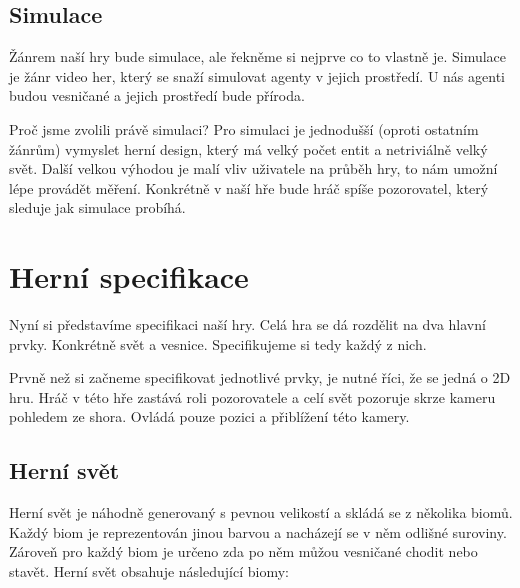 
\subsection{Simulace}
Žánrem naší hry bude simulace, ale řekněme si nejprve co to vlastně je. Simulace je žánr video her, který se snaží simulovat agenty v jejich prostředí. U nás agenti budou vesničané a jejich prostředí bude příroda.

Proč jsme zvolili právě simulaci? Pro simulaci je jednodušší (oproti ostatním žánrům) vymyslet herní design, který má velký počet entit a netriviálně velký svět. Další velkou výhodou je malí vliv uživatele na průběh hry, to nám umožní lépe provádět měření. Konkrétně v naší hře bude hráč spíše pozorovatel, který sleduje jak simulace probíhá.


\section{Herní specifikace}
Nyní si představíme specifikaci naší hry. Celá hra se dá rozdělit na dva hlavní prvky. Konkrétně svět a vesnice. Specifikujeme si tedy každý z nich.

Prvně než si začneme specifikovat jednotlivé prvky, je nutné říci, že se jedná o 2D hru. Hráč v této hře zastává roli pozorovatele a celí svět pozoruje skrze kameru pohledem ze shora. Ovládá pouze pozici a přiblížení této kamery.

\subsection{Herní svět}
Herní svět je náhodně generovaný s pevnou velikostí a skládá se z několika biomů. Každý biom je reprezentován jinou barvou a nacházejí se v něm odlišné suroviny. Zároveň pro každý biom je určeno zda po něm můžou vesničané chodit nebo stavět. Herní svět obsahuje následující biomy:


